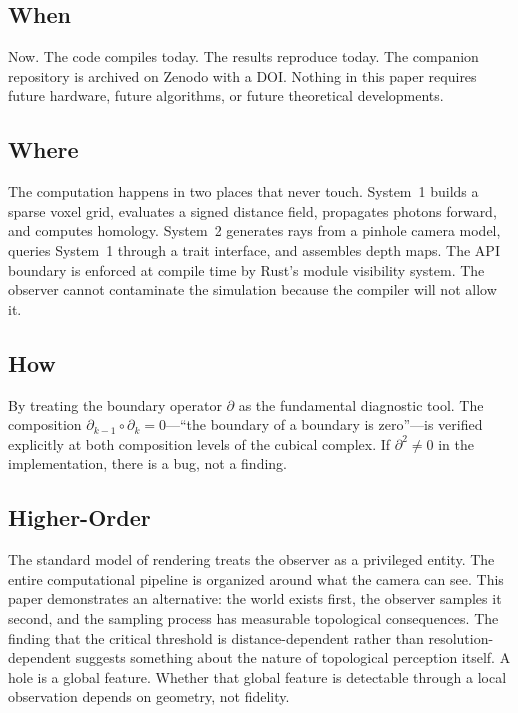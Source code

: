 \documentclass[11pt,a4paper]{article}
\theoremstyle{remark}
\begin{document}
\subsection*{When}

Now. The code compiles today. The results reproduce today. The companion repository is archived on Zenodo with a DOI. Nothing in this paper requires future hardware, future algorithms, or future theoretical developments.

\subsection*{Where}

The computation happens in two places that never touch. System~1 builds a sparse voxel grid, evaluates a signed distance field, propagates photons forward, and computes homology. System~2 generates rays from a pinhole camera model, queries System~1 through a trait interface, and assembles depth maps. The API boundary is enforced at compile time by Rust's module visibility system. The observer cannot contaminate the simulation because the compiler will not allow it.

\subsection*{How}

By treating the boundary operator $\partial$ as the fundamental diagnostic tool. The composition $\partial_{k-1} \circ \partial_k = 0$---``the boundary of a boundary is zero''---is verified explicitly at both composition levels of the cubical complex. If $\partial^2 \neq 0$ in the implementation, there is a bug, not a finding.

\subsection*{Higher-Order}

The standard model of rendering treats the observer as a privileged entity. The entire computational pipeline is organized around what the camera can see. This paper demonstrates an alternative: the world exists first, the observer samples it second, and the sampling process has measurable topological consequences. The finding that the critical threshold is distance-dependent rather than resolution-dependent suggests something about the nature of topological perception itself. A hole is a global feature. Whether that global feature is detectable through a local observation depends on geometry, not fidelity.
\end{document}
